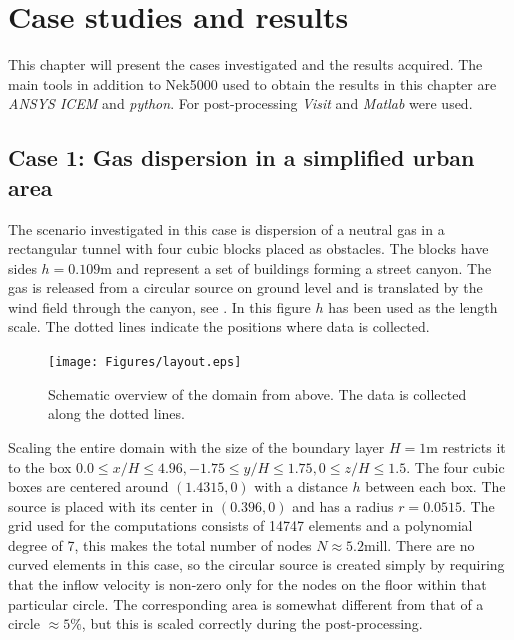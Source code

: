 
\chapter{Case studies and results} %

\label{results} %



This chapter will present the cases investigated and the results acquired.
The main tools in addition to Nek5000 used to obtain the results in this 
chapter are \textit{ANSYS ICEM} and \textit{python}. For post-processing \textit{Visit} and
\textit{Matlab} were used.
%
\section{Case 1: Gas dispersion in a simplified urban area} \label{case1}
The scenario investigated in this case is dispersion of a neutral gas in a rectangular tunnel
with four cubic blocks placed as obstacles. The blocks have sides $h = 0.109$m and represent a 
set of buildings forming a street canyon. The gas is released from a circular source on 
ground level and
is translated by the wind field through the canyon, see .
In this figure $h$ has been used as the length scale. The dotted lines
indicate the positions where data is collected.
%
\begin{figure}[h]
	\texttt{[image: Figures/layout.eps]}
	\caption{Schematic overview of the domain from above. The data is collected along the dotted lines.}
	\label{fig:layout}
\end{figure}
%

Scaling the entire domain with the size of the boundary layer $H =1$m restricts it to
the box $0.0\leq x/H \leq 4.96,-1.75\leq y/H \leq 1.75, 0\leq z/H \leq 1.5$.
The four cubic boxes are centered around $(1.4315,0)$ with a distance $h$ between each box.
The source is placed with its center in $(0.396,0)$ and has a radius $r = 0.0515$.
The grid used for the computations consists of 14747 elements and a polynomial degree of
7, this makes the total number of nodes $N\approx 5.2$mill. There are no curved elements in this case, so the 
circular source is created simply by requiring that the inflow velocity is non-zero only for the nodes
on the floor within that particular circle. The corresponding area is somewhat different from that
of a circle $\approx 5 \%$, but this is scaled correctly during the post-processing.

